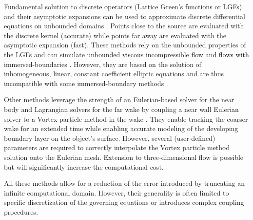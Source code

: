 \documentclass[preprint,12pt]{elsarticle}
\begin{document}

Fundamental solution to discrete operators (Lattice Green's functions or LGFs) and their asymptotic expansions can be used to approximate discrete differential equations on unbounded domains \cite{Liska2014AEquations}. Points close to the source are evaluated with the discrete kernel (accurate) while points far away are evaluated with the asymptotic expansion (fast). These methods rely on the unbounded properties of the LGFs and can simulate unbounded viscous incompressible flow \cite{Liska2016ADomains} and flows with immersed-boundaries \cite{Liska2017AFunctions}. However, they are based on the solution of inhomogeneous, linear, constant coefficient elliptic equations and are thus incompatible with some immersed-boundary methods \cite{Maertens2015, Lauber2022}.

Other methods leverage the strength of an Eulerian-based solver for the near body and Lagrangian solvers for the far wake by coupling a near wall Eulerian solver to a Vortex particle method in the wake \cite{Billuart2023AFlows}. They enable tracking the coarser wake for an extended time while enabling accurate modeling of the developing boundary layer on the object's surface. However, several (user-defined) parameters are required to correctly interpolate the Vortex particle method solution onto the Eulerian mesh. Extension to three-dimensional flow is possible but will significantly increase the computational cost.

All these methods allow for a reduction of the error introduced by truncating an infinite computational domain. However, their generality is often limited to specific discretization of the governing equations or introduces complex coupling procedures.
 
\end{document}
